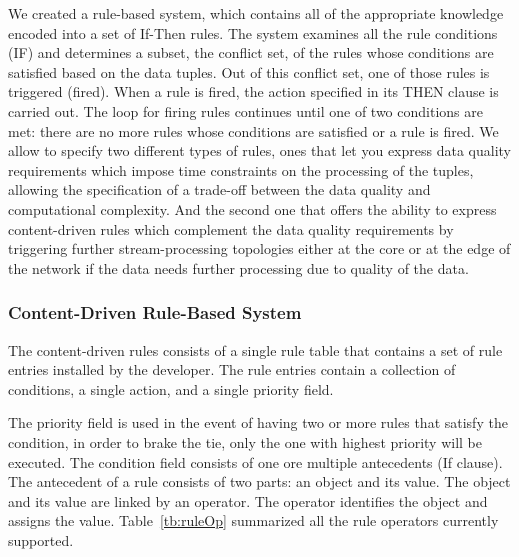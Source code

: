 We created a rule-based system, which contains all of the appropriate knowledge encoded into a set of If-Then rules. The system examines all the rule conditions (IF) and determines a subset, the conflict set, of the rules whose conditions are satisfied based on the data tuples. Out of this conflict set, one of those rules is triggered (fired). When a rule is fired, the action specified in its THEN clause is carried out. The loop for firing rules continues until one of two conditions are met: there are no more rules whose conditions are satisfied or a rule is fired. We allow to specify two different types of rules, ones that let you express data quality requirements which impose time constraints on the processing of the tuples, allowing the specification of a trade-off between the data quality and computational complexity. And the second one that offers the ability to express content-driven rules which complement the data quality requirements by triggering further stream-processing topologies either at the core or at the edge of the network if the data needs further processing due to quality of the data.

\subsubsection{Content-Driven Rule-Based System}
The content-driven rules consists of a single rule table that contains a set of rule entries installed by the developer. The rule entries contain a collection of conditions, a single action, and a single priority field.

The priority field is used in the event of having two or more rules that satisfy the condition, in order to brake the tie, only the one with highest priority will be executed. The condition field consists of one ore multiple antecedents (If clause). The antecedent of a rule consists of two parts: an object and its value. The object and its value are linked by an operator. The operator identifies the object and assigns the value. Table~\ref{tb:ruleOp} summarized all the rule operators currently supported.


